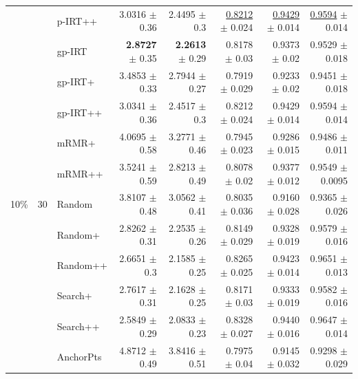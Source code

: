\begin{longtable}{llp{}rrrrr}
 &  & p-IRT++ & 3.0316 {\scriptsize $\pm$ 0.36} & 2.4495 {\scriptsize $\pm$ 0.3} & \underline{0.8212} {\scriptsize $\pm$ 0.024} & \underline{0.9429} {\scriptsize $\pm$ 0.014} & \underline{0.9594} {\scriptsize $\pm$ 0.014} \\
 &  & gp-IRT & \textbf{2.8727} {\scriptsize $\pm$ 0.35} & \textbf{2.2613} {\scriptsize $\pm$ 0.29} & 0.8178 {\scriptsize $\pm$ 0.03} & 0.9373 {\scriptsize $\pm$ 0.02} & 0.9529 {\scriptsize $\pm$ 0.018} \\
 &  & gp-IRT+ & 3.4853 {\scriptsize $\pm$ 0.33} & 2.7944 {\scriptsize $\pm$ 0.27} & 0.7919 {\scriptsize $\pm$ 0.029} & 0.9233 {\scriptsize $\pm$ 0.02} & 0.9451 {\scriptsize $\pm$ 0.018} \\
 &  & gp-IRT++ & 3.0341 {\scriptsize $\pm$ 0.36} & 2.4517 {\scriptsize $\pm$ 0.3} & 0.8212 {\scriptsize $\pm$ 0.024} & 0.9429 {\scriptsize $\pm$ 0.014} & 0.9594 {\scriptsize $\pm$ 0.014} \\
 &  & mRMR+ & 4.0695 {\scriptsize $\pm$ 0.58} & 3.2771 {\scriptsize $\pm$ 0.46} & 0.7945 {\scriptsize $\pm$ 0.023} & 0.9286 {\scriptsize $\pm$ 0.015} & 0.9486 {\scriptsize $\pm$ 0.011} \\
 &  & mRMR++ & 3.5241 {\scriptsize $\pm$ 0.59} & 2.8213 {\scriptsize $\pm$ 0.49} & 0.8078 {\scriptsize $\pm$ 0.02} & 0.9377 {\scriptsize $\pm$ 0.012} & 0.9549 {\scriptsize $\pm$ 0.0095} \\
\midrule
10\% & 30 & Random & 3.8107 {\scriptsize $\pm$ 0.48} & 3.0562 {\scriptsize $\pm$ 0.41} & 0.8035 {\scriptsize $\pm$ 0.036} & 0.9160 {\scriptsize $\pm$ 0.028} & 0.9365 {\scriptsize $\pm$ 0.026} \\
 &  & Random+ & 2.8262 {\scriptsize $\pm$ 0.31} & 2.2535 {\scriptsize $\pm$ 0.26} & 0.8149 {\scriptsize $\pm$ 0.029} & 0.9328 {\scriptsize $\pm$ 0.019} & 0.9579 {\scriptsize $\pm$ 0.016} \\
 &  & Random++ & 2.6651 {\scriptsize $\pm$ 0.3} & 2.1585 {\scriptsize $\pm$ 0.25} & 0.8265 {\scriptsize $\pm$ 0.025} & 0.9423 {\scriptsize $\pm$ 0.014} & 0.9651 {\scriptsize $\pm$ 0.013} \\
 &  & Search+ & 2.7617 {\scriptsize $\pm$ 0.31} & 2.1628 {\scriptsize $\pm$ 0.25} & 0.8171 {\scriptsize $\pm$ 0.03} & 0.9333 {\scriptsize $\pm$ 0.019} & 0.9582 {\scriptsize $\pm$ 0.016} \\
 &  & Search++ & 2.5849 {\scriptsize $\pm$ 0.29} & 2.0833 {\scriptsize $\pm$ 0.23} & 0.8328 {\scriptsize $\pm$ 0.027} & 0.9440 {\scriptsize $\pm$ 0.016} & 0.9647 {\scriptsize $\pm$ 0.014} \\
 &  & AnchorPts & 4.8712 {\scriptsize $\pm$ 0.49} & 3.8416 {\scriptsize $\pm$ 0.51} & 0.7975 {\scriptsize $\pm$ 0.04} & 0.9145 {\scriptsize $\pm$ 0.032} & 0.9298 {\scriptsize $\pm$ 0.029} \\

\end{longtable}
